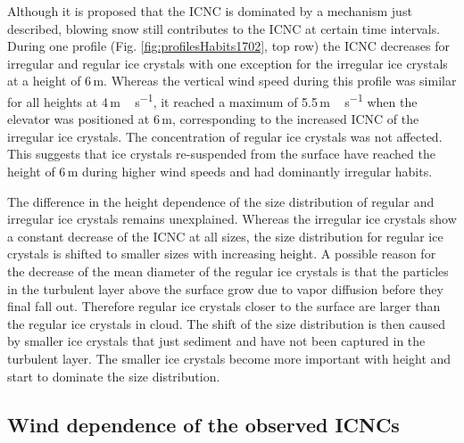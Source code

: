 \documentclass[draft,linenumbers]{agujournal}
\begin{document}
Although it is proposed that the ICNC is dominated by a mechanism just described, blowing snow still contributes to the ICNC at certain time intervals. During one profile  (Fig. \ref{fig:profilesHabits1702}, top row) the ICNC decreases for irregular and regular ice crystals with one exception for the irregular ice crystals at a height of 6\,\si{m}. Whereas the vertical wind speed during this profile was similar for all heights at 4\,\si{m\,s^{-1}}, it reached a maximum of 5.5\,\si{m\,s^{-1}} when the elevator was positioned at 6\,\si{m}, corresponding to the increased ICNC of the irregular ice crystals. The concentration of regular ice crystals was not affected. This suggests that ice crystals re-suspended from the surface have reached the height of 6\,\si{m} during higher wind speeds and had dominantly irregular habits. 

The difference in the height dependence of the size distribution of regular and irregular ice crystals remains unexplained. Whereas the irregular ice crystals show a constant decrease of the ICNC at all sizes, the size distribution for regular ice crystals is shifted to smaller sizes with increasing height. A possible reason for the decrease of the mean diameter of the regular ice crystals is that the particles in the turbulent layer above the surface grow due to vapor diffusion before they final fall out. Therefore regular ice crystals closer to the surface are larger than the regular ice crystals in cloud. The shift of the size distribution is then caused by smaller ice crystals that just sediment and have not been captured in the turbulent layer. The smaller ice crystals become more important with height and start to dominate the size distribution.


\subsection{Wind dependence of the observed ICNCs}
\end{document}
